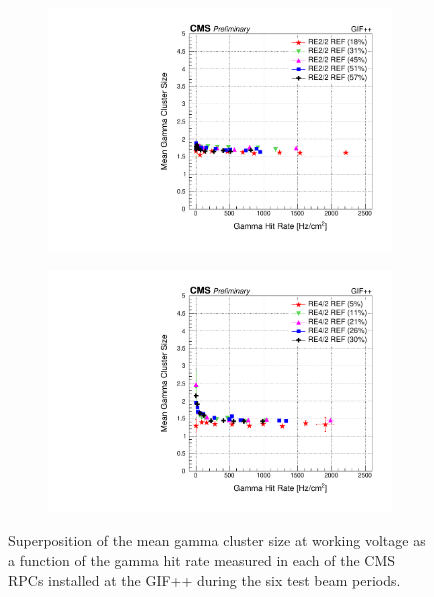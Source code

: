 \begin{figure}[H]
\begin{subfigure}{0.5\linewidth}
    		\includegraphics[width = \linewidth]{fig/chapt5/RE2-2_REF_Cluster_vs_Rate.pdf}
        	\caption{\label{fig:GIFpp_gcls_vs_rate:C}}
    	\end{subfigure}
    	\begin{subfigure}{0.5\linewidth}
			\centering
    		\includegraphics[width = \linewidth]{fig/chapt5/RE4-2_REF_Cluster_vs_Rate.pdf}
        	\caption{\label{fig:GIFpp_gcls_vs_rate:D}}
    	\end{subfigure}
		\caption{\label{fig:GIFpp_gcls_vs_rate} Superposition of the mean gamma cluster size at working voltage as a function of the gamma hit rate measured in each of the CMS RPCs installed at the GIF++ during the six test beam periods.}
	\end{figure}
	
